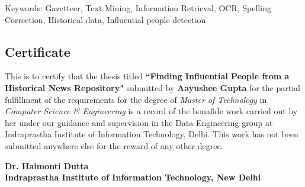 \documentclass[letterpaper,11pt]{report}
\begin{document}


\newpage

\pagestyle{empty}
\vspace*{7.1in} 
Keywords: Gazetteer, Text Mining, Information Retrieval, OCR, Spelling Correction, Historical data, Influential people detection

\newpage

\begin{center}
\section*{Certificate}\label{section:certificate}
\end{center}
This is to certify that the thesis titled \textbf{``Finding Influential People from a Historical News Repository"} submitted by \textbf{Aayushee Gupta} for the partial fulfillment of the requirements for the degree of \emph{Master of Technology} in \emph{Computer Science \& Engineering} is a record of the bonafide work carried out by her under our guidance and supervision in the Data Engineering group at Indraprastha Institute of Information Technology, Delhi. This work has not been submitted anywhere else for the reward of any other degree. \\ \vspace{0.5in}

\textbf{Dr. Haimonti Dutta}\\
\textbf{Indraprastha Institute of Information Technology, New Delhi}
\end{document}
